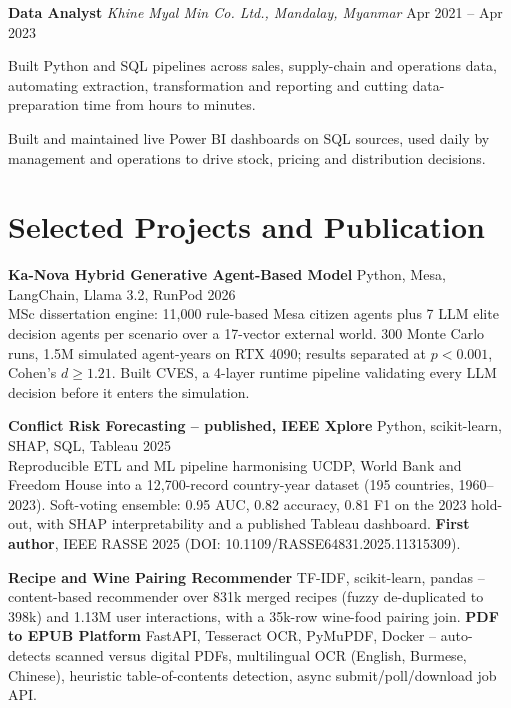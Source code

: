 \documentclass[letterpaper,10pt]{article}
\newcommand{\role}[3]{\textbf{#1} \textbar{} \textit{#2} \hfill #3\\[1pt]}
\newcommand{\entry}[3]{\textbf{#1} \textbar{} #2 \hfill #3\\}
\begin{document}
\vspace{2pt}
\role{Data Analyst}{Khine Myal Min Co. Ltd., Mandalay, Myanmar}{Apr 2021 -- Apr 2023}
\begin{tight}
  \item Built Python and SQL pipelines across sales, supply-chain and operations data,
  automating extraction, transformation and reporting and cutting data-preparation time from
  hours to minutes.
  \item Built and maintained live Power BI dashboards on SQL sources, used daily by management
  and operations to drive stock, pricing and distribution decisions.
\end{tight}

\section*{Selected Projects and Publication}

\entry{Ka-Nova Hybrid Generative Agent-Based Model}{Python, Mesa, LangChain, Llama 3.2, RunPod}{2026}
MSc dissertation engine: 11,000 rule-based Mesa citizen agents plus 7 LLM elite decision
agents per scenario over a 17-vector external world. 300 Monte Carlo runs, 1.5M simulated
agent-years on RTX 4090; results separated at $p<0.001$, Cohen's $d \geq 1.21$. Built CVES,
a 4-layer runtime pipeline validating every LLM decision before it enters the simulation.

\vspace{1pt}
\entry{Conflict Risk Forecasting -- published, IEEE Xplore}{Python, scikit-learn, SHAP, SQL, Tableau}{2025}
Reproducible ETL and ML pipeline harmonising UCDP, World Bank and Freedom House into a
12,700-record country-year dataset (195 countries, 1960--2023). Soft-voting ensemble: 0.95
AUC, 0.82 accuracy, 0.81 F1 on the 2023 hold-out, with SHAP interpretability and a published
Tableau dashboard. \textbf{First author}, IEEE RASSE 2025 (DOI: 10.1109/RASSE64831.2025.11315309).

\vspace{1pt}
\textbf{Recipe and Wine Pairing Recommender} \textbar{} TF-IDF, scikit-learn, pandas -- content-based
recommender over 831k merged recipes (fuzzy de-duplicated to 398k) and 1.13M user interactions,
with a 35k-row wine-food pairing join. \textbf{PDF to EPUB Platform} \textbar{} FastAPI, Tesseract
OCR, PyMuPDF, Docker -- auto-detects scanned versus digital PDFs, multilingual OCR (English,
Burmese, Chinese), heuristic table-of-contents detection, async submit/poll/download job API.
\end{document}

